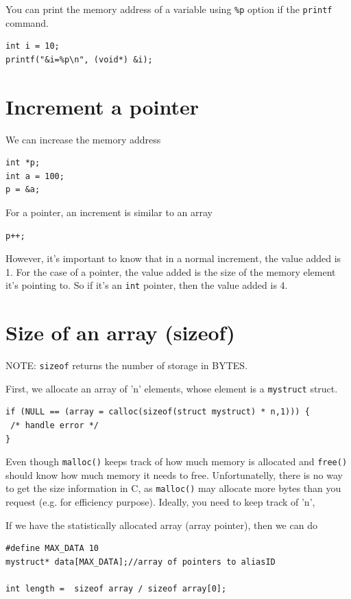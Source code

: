 You can print the memory address of a variable using \verb!%p! option
if the \verb!printf! command.
\begin{lstlisting}
int i = 10;
printf("&i=%p\n", (void*) &i);
\end{lstlisting}

\section{Increment a pointer}

We can increase the memory address 

\begin{verbatim}
int *p;
int a = 100;
p = &a;
\end{verbatim}

For a pointer, an increment is similar to an array
\begin{verbatim}
p++;
\end{verbatim}
However, it's important to know that in a normal increment, the value added is
1. For the case of a pointer, the value added is the size of the memory element
it's pointing to. So if it's an \verb!int! pointer, then the value added is 4.

\section{Size of an array (sizeof)}

NOTE: \verb!sizeof! returns the number of storage in BYTES.

First, we allocate an array of 'n' elements, whose element is a \verb!mystruct!
struct.
\begin{verbatim}
if (NULL == (array = calloc(sizeof(struct mystruct) * n,1))) {
 /* handle error */
}
\end{verbatim}

Even though \verb!malloc()! keeps track of how much memory is allocated and
\verb!free()! should know how much memory it needs to free. Unfortunatelly,
there is no way to get the size information in C, as \verb!malloc()! may
allocate more bytes than you request (e.g. for efficiency purpose). Ideally, you
need to keep track of 'n', 

If we have the statistically allocated array (array pointer), then we can do
\begin{verbatim}
#define MAX_DATA 10
mystruct* data[MAX_DATA];//array of pointers to aliasID

int length =  sizeof array / sizeof array[0];
\end{verbatim}


